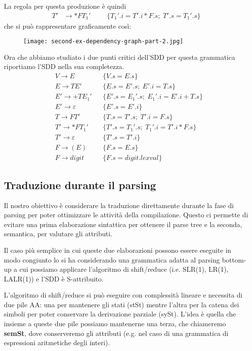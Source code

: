 \documentclass[class=book, crop=false, oneside, 12pt]{standalone}
\begin{document}
La regola per questa produzione è quindi
\begin{align*}
    T' &\to *FT_1' & & &\{T_1'.i = T'.i * F.s; \; T'.s = T_1'.s\}
\end{align*}
che si può rappresentare graficamente così:
\begin{figure}[H]
    \centering
    \texttt{[image: second-ex-dependency-graph-part-2.jpg]}
\end{figure}
Ora che abbiamo studiato i due punti critici dell'SDD per questa grammatica riportiamo l'SDD nella sua completezza.
\begin{align*}
    &V  \to E & &\{V.s = E.s\} \\
    &E  \to TE' & &\{E.s = E'.s; \; E'.i = T.s\} \\
    &E' \to +TE_1' & &\{E'.s = E_1'.s; \; E_1'.i = E'.i + T.s\} \\
    &E' \to \varepsilon & &\{E'.s = E'.i\} \\
    &T  \to FT' & &\{T.s = T'.s; \; T'.i = F.s\} \\
    &T' \to *FT_1' & &\{T'.s = T_1'.s; \; T_1'.i = T'.i * F.s\} \\
    &T' \to \varepsilon & &\{T'.s = T'.i\} \\
    &F  \to (E) & &\{F.s = E.s\} \\
    &F  \to digit & &\{F.s = digit.lexval\}
\end{align*}

\subsection{Traduzione durante il parsing}

Il nostro obiettivo è considerare la traduzione direttamente durante la fase di parsing per poter ottimizzare le attività della compilazione. Questo ci permette di evitare una prima elaborazione sintattica per ottenere il parse tree e la seconda, semantica, per valutare gli attributi.

Il caso più semplice in cui queste due elaborazioni possono essere eseguite in modo congiunto lo si ha considerando una grammatica adatta al parsing bottom-up a cui possiamo applicare l'algoritmo di shift/reduce (i.e. SLR(1), LR(1), LALR(1)) e l'SDD è S-attribuito.

L'algoritmo di shift/reduce si può eseguire con complessità lineare e necessita di due pile AA: una per mantenere gli stati (stSt) mentre l'altra per la catena dei simboli per poter conservare la derivazione parziale (sySt). L'idea è quella che insieme a queste due pile possiamo mantenerne una terza, che chiameremo \textbf{semSt}, dove conserveremo gli attributi (e.g. nel caso di una grammatica di espressioni aritmetiche degli interi).
\end{document}
